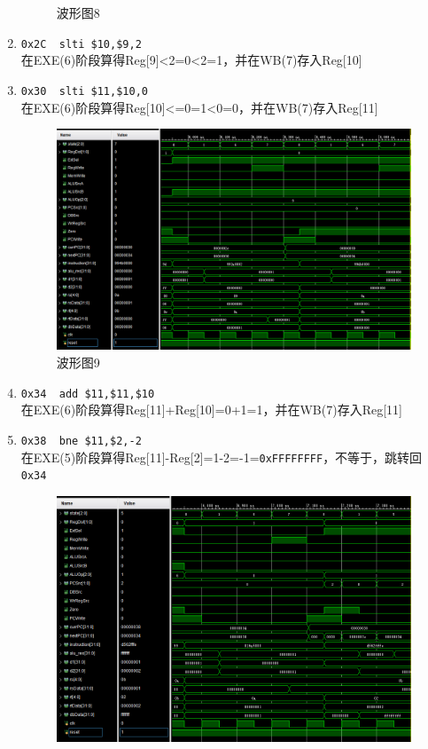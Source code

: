 \begin{enumerate}
\begin{figure}[H]
\caption{波形图8}
\label{fig:wave_8}
\end{figure}
    \item \verb'0x2C  slti $10,$9,2'\\
    在EXE(6)阶段算得Reg[9]<2=0<2=1，并在WB(7)存入Reg[10]
    \item \verb'0x30  slti $11,$10,0'\\
    在EXE(6)阶段算得Reg[10]<=0=1<0=0，并在WB(7)存入Reg[11]
\begin{figure}[H]
\centering
\includegraphics[width=0.9\linewidth]{fig/FullIns/Ins9.PNG}
\caption{波形图9}
\label{fig:wave_9}
\end{figure}
    \item \verb'0x34  add $11,$11,$10'\\
    在EXE(6)阶段算得Reg[11]+Reg[10]=0+1=1，并在WB(7)存入Reg[11]
    \item \verb'0x38  bne $11,$2,-2'\\
    在EXE(5)阶段算得Reg[11]-Reg[2]=1-2=-1=\verb'0xFFFFFFFF'，不等于，跳转回\verb'0x34'
\begin{figure}[H]
\centering
\includegraphics[width=0.9\linewidth]{fig/FullIns/Ins10.PNG}

\end{figure}
\end{enumerate}
